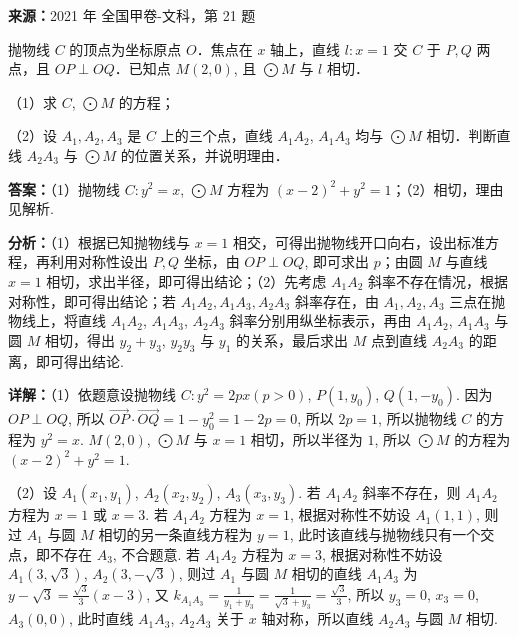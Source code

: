 \begin{question}[points=12]
\textbf{来源：}2021 年 全国甲卷-文科，第 21 题\par
抛物线 $C$ 的顶点为坐标原点 $O$．焦点在 $x$ 轴上，直线 $l: x=1$ 交 $C$ 于 $P, Q$ 两点，且 $OP \perp OQ$．已知点 $M(2,0)$, 且 $\bigodot M$ 与 $l$ 相切．



（1）求 $C$, $\bigodot M$ 的方程；



（2）设 $A_1, A_2, A_3$ 是 $C$ 上的三个点，直线 $A_1A_2$, $A_1A_3$ 均与 $\bigodot M$ 相切．判断直线 $A_2A_3$ 与 $\bigodot M$ 的位置关系，并说明理由．
\begin{solution}
\textbf{答案：}（1）抛物线 $C: y^2 = x$, $\bigodot M$ 方程为 $(x-2)^2 + y^2 = 1$；（2）相切，理由见解析.

\textbf{分析：}（1）根据已知抛物线与 $x=1$ 相交，可得出抛物线开口向右，设出标准方程，再利用对称性设出 $P, Q$ 坐标，由 $OP \perp OQ$, 即可求出 $p$；由圆 $M$ 与直线 $x=1$ 相切，求出半径，即可得出结论；（2）先考虑 $A_1A_2$ 斜率不存在情况，根据对称性，即可得出结论；若 $A_1A_2, A_1A_3, A_2A_3$ 斜率存在，由 $A_1, A_2, A_3$ 三点在抛物线上，将直线 $A_1A_2$, $A_1A_3$, $A_2A_3$ 斜率分别用纵坐标表示，再由 $A_1A_2$, $A_1A_3$ 与圆 $M$ 相切，得出 $y_2+y_3$, $y_2y_3$ 与 $y_1$ 的关系，最后求出 $M$ 点到直线 $A_2A_3$ 的距离，即可得出结论.

\textbf{详解：}（1）依题意设抛物线 $C: y^2 = 2px (p>0)$, $P(1, y_0)$, $Q(1, -y_0)$. 因为 $OP \perp OQ$, 所以 $\overrightarrow{OP} \cdot \overrightarrow{OQ} = 1 - y_0^2 = 1 - 2p = 0$, 所以 $2p=1$, 所以抛物线 $C$ 的方程为 $y^2 = x$. $M(2,0)$, $\bigodot M$ 与 $x=1$ 相切，所以半径为 $1$, 所以 $\bigodot M$ 的方程为 $(x-2)^2 + y^2 = 1$.

（2）设 $A_1(x_1, y_1)$, $A_2(x_2, y_2)$, $A_3(x_3, y_3)$. 若 $A_1A_2$ 斜率不存在，则 $A_1A_2$ 方程为 $x=1$ 或 $x=3$. 若 $A_1A_2$ 方程为 $x=1$, 根据对称性不妨设 $A_1(1,1)$, 则过 $A_1$ 与圆 $M$ 相切的另一条直线方程为 $y=1$, 此时该直线与抛物线只有一个交点，即不存在 $A_3$, 不合题意. 若 $A_1A_2$ 方程为 $x=3$, 根据对称性不妨设 $A_1(3,\sqrt{3})$, $A_2(3,-\sqrt{3})$, 则过 $A_1$ 与圆 $M$ 相切的直线 $A_1A_3$ 为 $y-\sqrt{3} = \frac{\sqrt{3}}{3}(x-3)$, 又 $k_{A_1A_3} = \frac{1}{y_1+y_3} = \frac{1}{\sqrt{3}+y_3} = \frac{\sqrt{3}}{3}$, 所以 $y_3=0$, $x_3=0$, $A_3(0,0)$, 此时直线 $A_1A_3$, $A_2A_3$ 关于 $x$ 轴对称，所以直线 $A_2A_3$ 与圆 $M$ 相切.


\end{solution}
\end{question}

